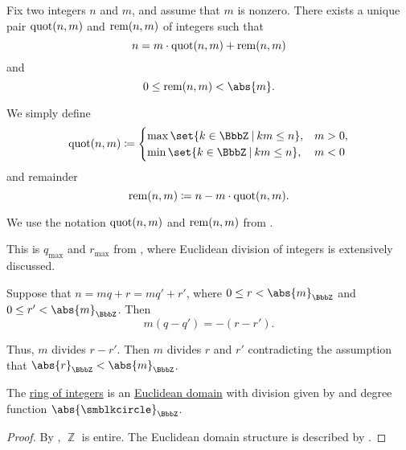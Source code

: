 \begin{algorithm}\label{alg:integer_division}
  Fix two integers \( n \) and \( m \), and assume that \( m \) is nonzero. There exists a unique pair \( \operatorname{quot}(n, m) \) and \( \operatorname{rem}(n, m) \) of integers such that
  \begin{equation}
    n = m \cdot \operatorname{quot}(n, m) + \operatorname{rem}(n, m)
  \end{equation}
  and
  \begin{equation*}
    0 \leq \rem(n, m) < \abs{m}.
  \end{equation*}

  We simply define
  \begin{equation}\label{eq:alg:integer_division/quot}
    \quot(n, m) \coloneqq \begin{cases}
      \max\set{ k \in \BbbZ \given km \leq n }, &m > 0, \\
      \min\set{ k \in \BbbZ \given km \leq n }, &m < 0
    \end{cases}
  \end{equation}
  and remainder
  \begin{equation}\label{eq:alg:integer_division/rem}
    \operatorname{rem}(n, m) \coloneqq n - m \cdot \operatorname{quot}(n, m).
  \end{equation}
\end{algorithm}
\begin{comments}
  \item We use the notation \( \operatorname{quot}(n, m) \) and \( \operatorname{rem}(n, m) \) from .
  \item This is \( q_{\max} \) and \( r_{\max} \) from , where Euclidean division of integers is extensively discussed.
\end{comments}
\begin{defproof}
  \UniquenessSubProof Suppose that \( n = mq + r = mq' + r' \), where \( 0 \leq r < \abs{m}_\BbbZ \) and \( 0 \leq r' < \abs{m}_\BbbZ \). Then
  \begin{equation*}
    m(q - q') = -(r - r').
  \end{equation*}

  Thus, \( m \) divides \( r - r' \). Then \( m \) divides \( r \) and \( r' \) contradicting the assumption that \( \abs{r}_\BbbZ < \abs{m}_\BbbZ \).
\end{defproof}

\begin{proposition}\label{thm:integers_are_euclidean_domain}
  The \hyperref[def:integers]{ring of integers} is an \hyperref[def:euclidean_domain]{Euclidean domain} with division given by  and degree function \( \abs{\anon}_\BbbZ \).
\end{proposition}
\begin{proof}
  By , \( \BbbZ \) is entire. The Euclidean domain structure is described by .
\end{proof}

